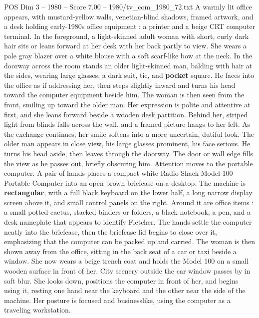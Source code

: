 \begin{textsample}{POS Dim 3 – 1980 – Score 7.00 – 1980/tv\_com\_1980\_72.txt}  \label{ex:f3_pos_047}
A warmly lit office appears, with mustard-yellow walls, venetian-blind shadows, framed artwork, and a desk holding early-1980s office equipment : a printer and a beige CRT computer terminal.
In the foreground, a light-skinned adult woman with short, curly dark hair sits or leans forward at her desk with her back partly to view.
She wears a pale gray blazer over a white blouse with a soft scarf-like bow at the neck.
In the doorway across the room stands an older light-skinned man, balding with hair at the sides, wearing large glasses, a dark suit, tie, and \textbf{pocket} square.
He faces into the office as if addressing her, then steps slightly inward and turns his head toward the computer equipment beside him.
The woman is then seen from the front, smiling up toward the older man.
Her expression is polite and attentive at first, and she leans forward beside a wooden desk partition.
Behind her, striped light from blinds falls across the wall, and a framed picture hangs to her left.
As the exchange continues, her smile softens into a more uncertain, dutiful look.
The older man appears in close view, his large glasses prominent, his face serious.
He turns his head aside, then leaves through the doorway.
The door or wall edge fills the view as he passes out, briefly obscuring him.
Attention moves to the portable computer.
A pair of hands places a compact white Radio Shack Model 100 Portable Computer into an open brown briefcase on a desktop.
The machine is \textbf{rectangular}, with a full black keyboard on the lower half, a long narrow display screen above it, and small control panels on the right.
Around it are office items : a small potted cactus, stacked binders or folders, a black notebook, a pen, and a desk nameplate that appears to identify Fletcher.
The hands settle the computer neatly into the briefcase, then the briefcase lid begins to close over it, emphasizing that the computer can be packed up and carried.
The woman is then shown away from the office, sitting in the back seat of a car or taxi beside a window.
She now wears a beige trench coat and holds the Model 100 on a small wooden surface in front of her.
City scenery outside the car window passes by in soft blur.
She looks down, positions the computer in front of her, and begins using it, resting one hand near the keyboard and the other near the side of the machine.
Her posture is focused and businesslike, using the computer as a traveling workstation.

\end{textsample}
